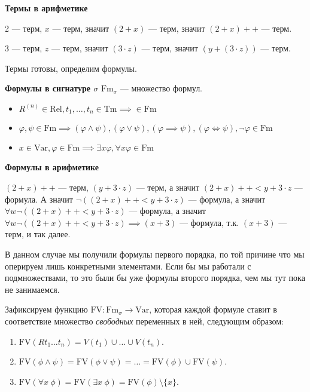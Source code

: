 \documentclass[a4paper, fleqn]{article}
\begin{document}
    \begin{example}
        \textbf{Термы в арифметике}

        2 --- терм, $x$ --- терм, значит $(2 + x)$ --- терм, значит $(2 + x)++$ --- терм.

        3 --- терм, $z$ --- терм, значит $(3 \cdot z)$ --- терм, значит $(y + (3 \cdot z))$ --- терм.
    \end{example}

    Термы готовы, определим формулы.

    \begin{definition}
        \textbf{Формулы в сигнатуре $\sigma$} $\text{Fm}_\sigma$ --- множество формул.
        \begin{itemize}
            \item $R^{(n)} \in \text{Rel}, t_1, \dots, t_n \in \text{Tm} \implies  \in \text{Fm}$
            \item $\varphi, \psi \in \text{Fm} \implies (\varphi \land \psi), (\varphi \lor \psi),
            (\varphi \implies \psi), (\varphi \iff \psi), \neg \varphi \in \text{Fm}$
            \item $x \in \text{Var}, \varphi \in \text{Fm} \implies \exists x \varphi, \forall x \varphi
            \in \text{Fm}$
        \end{itemize}
    \end{definition}

    \begin{example}
        \textbf{Формулы в арифметике}

        $(2 + x)++$ --- терм, $(y + 3 \cdot z)$ --- терм, а значит $(2 + x)++ < y + 3 \cdot z$ ---
        формула. А значит $\neg((2 + x)++ < y + 3 \cdot z)$ --- формула, а значит $\forall w \neg((2 + x)++ < y + 3 \cdot z)$
        --- формула, а значит $\forall w \neg((2 + x)++ < y + 3 \cdot z) \implies (x + 3)$ --- формула,
        т.к. $(x + 3)$ --- терм, и так далее.
    \end{example}

    В данном случае мы получили формулы первого порядка, по той причине что мы оперируем лишь конкретными
    элементами. Если бы мы работали с подмножествами, то это были бы уже формулы второго порядка, чем
    мы тут пока не занимаемся.

    \begin{definition}
        Зафиксируем функцию $\text{FV} \colon \text{Fm}_{\sigma} \to \text{Var}$, которая каждой формуле ставит в 
        соответствие множество {\it свободных} переменных в ней, следующим образом:
        \begin{enumerate}
            \item $\text{FV}(R t_{1} \ldots t_{n}) = V(t_{1}) \cup \ldots \cup V(t_{n})$.
            \item $\text{FV}(\phi \land \psi) =\text{FV}(\phi \lor \psi) = \ldots =\text{FV}(\phi) \cup\text{FV}(\psi)$.
            \item $\text{FV}(\forall x~\phi) =\text{FV}(\exists x~\phi) =\text{FV}(\phi) \setminus \{x\}$.
        \end{enumerate}
    \end{definition}
\end{document}
